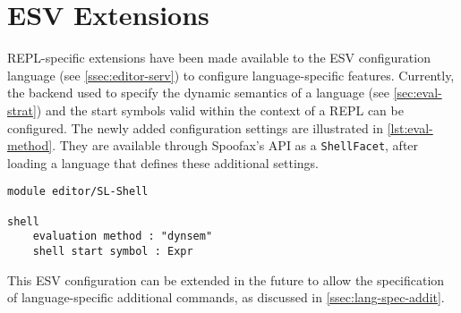 \section{ESV Extensions}
\label{sec:esv-extensions}

REPL-specific extensions have been made available to the ESV configuration
language (see \cref{ssec:editor-serv}) to configure language-specific
features. Currently, the backend used to specify the dynamic semantics of a
language (see \cref{sec:eval-strat}) and the start symbols valid within the
context of a REPL can be configured. The newly added configuration settings are
illustrated in \cref{lst:eval-method}. They are available through Spoofax's API
as a \texttt{ShellFacet}, after loading a language that defines these additional
settings.

\begin{lstlisting}[language=esv,caption={Configuring language specific settings.},label={lst:eval-method}]
module editor/SL-Shell

shell
    evaluation method : "dynsem"
    shell start symbol : Expr
\end{lstlisting}

This ESV configuration can be extended in the future to allow the specification
of language-specific additional commands, as discussed in
\cref{ssec:lang-spec-addit}.

